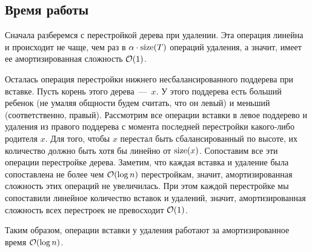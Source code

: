 \subsection{Время работы}

Сначала разберемся с перестройкой дерева при удалении. Эта операция линейна и происходит не чаще, чем раз в $\alpha \cdot \operatorname{size}(T)$ операций удаления, а значит, имеет ее амортизированная сложность $\mathcal{O}(1)$.

Осталась операция перестройки нижнего несбалансированного поддерева при вставке. Пусть корень этого дерева~---~$x$. У этого поддерева есть больший ребенок (не умаляя общности будем считать, что он левый) и меньший (соответственно, правый). Рассмотрим все операции вставки в левое поддерево и удаления из правого поддерева с момента последней перестройки какого-либо родителя $x$. Для того, чтобы $x$ перестал быть сбалансированный по высоте, их количество должно быть хотя бы линейно от $\operatorname{size}(x)$. Сопоставим все эти операции перестройке дерева. Заметим, что каждая вставка и удаление была сопоставлена не более чем $\mathcal{O}(\log n)$ перестройкам, значит, амортизированная сложность этих операций не увеличилась. При этом каждой перестройке мы сопоставили линейное количество вставок и удалений, значит, амортизированная сложность всех перестроек не превосходит $\mathcal{O}(1)$.

Таким образом, операции вставки у удаления работают за амортизированное время $\mathcal{O}(\log n)$.
